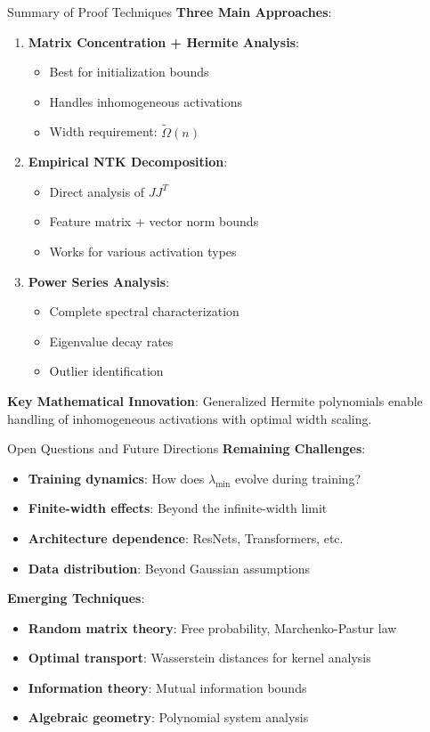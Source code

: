 \begin{frame}{Summary of Proof Techniques}
  \textbf{Three Main Approaches}:
  \begin{enumerate}[<+->]
    \item \textbf{Matrix Concentration + Hermite Analysis}:
    \begin{itemize}
      \item Best for initialization bounds
      \item Handles inhomogeneous activations
      \item Width requirement: $\tilde{\Omega}(n)$
    \end{itemize}
    \item \textbf{Empirical NTK Decomposition}:
    \begin{itemize}
      \item Direct analysis of $JJ^T$
      \item Feature matrix + vector norm bounds
      \item Works for various activation types
    \end{itemize}
    \item \textbf{Power Series Analysis}:
    \begin{itemize}
      \item Complete spectral characterization
      \item Eigenvalue decay rates
      \item Outlier identification
    \end{itemize}
  \end{enumerate}
  
  \textbf{Key Mathematical Innovation}: Generalized Hermite polynomials enable handling of inhomogeneous activations with optimal width scaling.
\end{frame}

\begin{frame}{Open Questions and Future Directions}
  \textbf{Remaining Challenges}:
  \begin{itemize}[<+->]
    \item \textbf{Training dynamics}: How does $\lambda_{\min}$ evolve during training?
    \item \textbf{Finite-width effects}: Beyond the infinite-width limit
    \item \textbf{Architecture dependence}: ResNets, Transformers, etc.
    \item \textbf{Data distribution}: Beyond Gaussian assumptions
  \end{itemize}
  
  \textbf{Emerging Techniques}:
  \begin{itemize}[<+->]
    \item \textbf{Random matrix theory}: Free probability, Marchenko-Pastur law
    \item \textbf{Optimal transport}: Wasserstein distances for kernel analysis
    \item \textbf{Information theory}: Mutual information bounds
    \item \textbf{Algebraic geometry}: Polynomial system analysis
  \end{itemize}
\end{frame}

